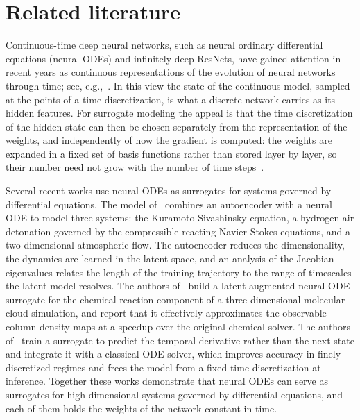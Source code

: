 \documentclass[pdflatex,sn-mathphys-num]{sn-jnl}%
\theoremstyle{thmstyleone}%
\theoremstyle{thmstyletwo}%
\theoremstyle{thmstylethree}%
\begin{document}
\section{Related literature}\label{sect:lit}

Continuous-time deep neural networks, such as neural ordinary differential equations (neural ODEs) and infinitely deep ResNets, have gained attention in recent years as continuous representations of the evolution of neural networks through time; see, e.g.,~\cite{E:2017kz, ruthotto2024differential}.
%
In this view the state of the continuous model, sampled at the points of a time discretization, is what a discrete network carries as its hidden features.
%
For surrogate modeling the appeal is that the time discretization of the hidden state can then be chosen separately from the representation of the weights, and independently of how the gradient is computed: the weights are expanded in a fixed set of basis functions rather than stored layer by layer, so their number need not grow with the number of time steps~\cite{gunther}.

Several recent works use neural ODEs as surrogates for systems governed by differential equations.
%
The model of~\cite{nair2024investigation} combines an autoencoder with a neural ODE to model three systems: the Kuramoto-Sivashinsky equation, a hydrogen-air detonation governed by the compressible reacting Navier-Stokes equations, and a two-dimensional atmospheric flow.
%
The autoencoder reduces the dimensionality, the dynamics are learned in the latent space, and an analysis of the Jacobian eigenvalues relates the length of the training trajectory to the range of timescales the latent model resolves.
%
The authors of~\cite{Vermari_n_2025} build a latent augmented neural ODE surrogate for the chemical reaction component of a three-dimensional molecular cloud simulation, and report that it effectively approximates the observable column density maps at a speedup over the original chemical solver.
%
The authors of~\cite{Zhou_2025_neuralPDE} train a surrogate to predict the temporal derivative rather than the next state and integrate it with a classical ODE solver, which improves accuracy in finely discretized regimes and frees the model from a fixed time discretization at inference.
%
Together these works demonstrate that neural ODEs can serve as surrogates for high-dimensional systems governed by differential equations, and each of them holds the weights of the network constant in time.
\end{document}
